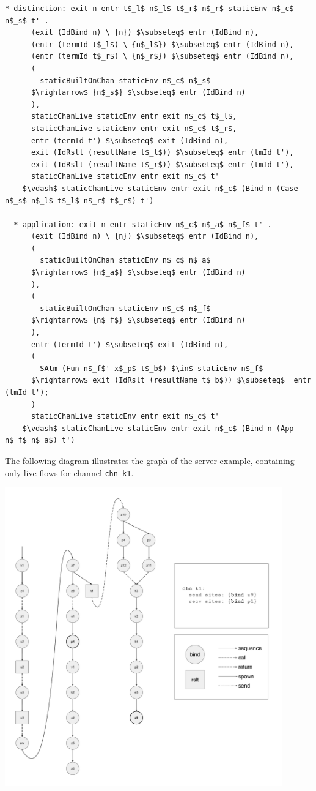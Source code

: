 \documentclass[letterpaper, 11pt]{report}
\begin{document}
\begin{lstlisting}[language=logic, mathescape]
  * distinction: exit n entr t$_l$ n$_l$ t$_r$ n$_r$ staticEnv n$_c$ n$_s$ t' .
      (exit (IdBind n) \ {n}) $\subseteq$ entr (IdBind n),
      (entr (termId t$_l$) \ {n$_l$}) $\subseteq$ entr (IdBind n),
      (entr (termId t$_r$) \ {n$_r$}) $\subseteq$ entr (IdBind n),
      (
        staticBuiltOnChan staticEnv n$_c$ n$_s$
      $\rightarrow$ {n$_s$} $\subseteq$ entr (IdBind n)
      ),
      staticChanLive staticEnv entr exit n$_c$ t$_l$,
      staticChanLive staticEnv entr exit n$_c$ t$_r$,
      entr (termId t') $\subseteq$ exit (IdBind n),
      exit (IdRslt (resultName t$_l$)) $\subseteq$ entr (tmId t'),
      exit (IdRslt (resultName t$_r$)) $\subseteq$ entr (tmId t'),
      staticChanLive staticEnv entr exit n$_c$ t'
    $\vdash$ staticChanLive staticEnv entr exit n$_c$ (Bind n (Case n$_s$ n$_l$ t$_l$ n$_r$ t$_r$) t')

  * application: exit n entr staticEnv n$_c$ n$_a$ n$_f$ t' .
      (exit (IdBind n) \ {n}) $\subseteq$ entr (IdBind n),
      (
        staticBuiltOnChan staticEnv n$_c$ n$_a$
      $\rightarrow$ {n$_a$} $\subseteq$ entr (IdBind n)
      ),
      (
        staticBuiltOnChan staticEnv n$_c$ n$_f$
      $\rightarrow$ {n$_f$} $\subseteq$ entr (IdBind n)
      ),
      entr (termId t') $\subseteq$ exit (IdBind n),
      (
        SAtm (Fun n$_f$' x$_p$ t$_b$) $\in$ staticEnv n$_f$
      $\rightarrow$ exit (IdRslt (resultName t$_b$)) $\subseteq$  entr (tmId t');
      )
      staticChanLive staticEnv entr exit n$_c$ t'
    $\vdash$ staticChanLive staticEnv entr exit n$_c$ (Bind n (App n$_f$ n$_a$) t')
\end{lstlisting}


The following diagram illustrates the graph of the server example,
containing only live flows for channel \lstinline{chn k1}. \

\includegraphics[width=0.9\textwidth]{cml-graph-k1.pdf}
\end{document}
